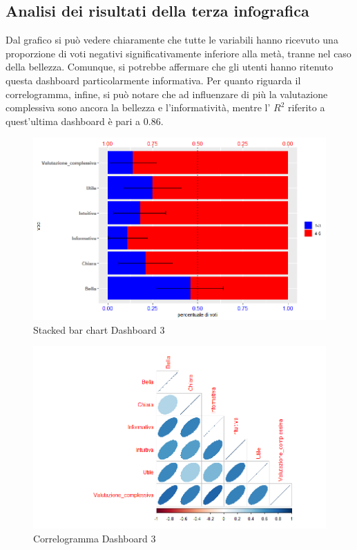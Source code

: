 \documentclass[12pt]{article}
\begin{document}
\subsection{Analisi dei risultati della terza infografica}
Dal grafico si può vedere chiaramente che tutte le variabili hanno ricevuto una proporzione di voti negativi significativamente inferiore alla metà, tranne nel caso della bellezza. Comunque, si potrebbe affermare che gli utenti hanno ritenuto questa dashboard particolarmente informativa.
Per quanto riguarda il correlogramma, infine, si può notare che ad influenzare di più la valutazione complessiva sono ancora la bellezza e l'informatività, mentre l' $R^2$ riferito a quest'ultima dashboard è pari a 0.86.

\begin{figure}[H]
    \centering
    \includegraphics[scale = 0.55]{img/Questionari/StackedBarplot_3.png}
    \caption{Stacked bar chart Dashboard 3}
\end{figure}


\begin{figure}[H]
    \hspace{20pt}
    \vspace{-20pt}
    \includegraphics[scale = 0.6]{img/Questionari/Correlogramma_3.png}
    \caption{Correlogramma Dashboard 3}
\end{figure}
\end{document}
